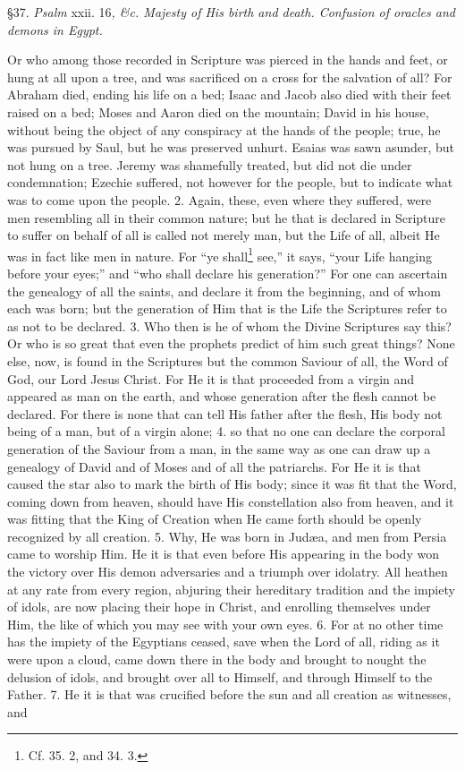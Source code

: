 
§37. \emph{Psalm} xxii. 16\emph{, \&c. Majesty of His birth and death. Confusion of oracles and demons in Egypt.}

Or who among those recorded in Scripture was pierced in the hands and feet, or hung at all upon a tree, and was sacrificed on a cross for the salvation of all? For Abraham died, ending his life on a bed; Isaac and Jacob also died with their feet raised on a bed; Moses and Aaron died on the mountain; David in his house, without being the object of any conspiracy at the hands of the people; true, he was pursued by Saul, but he was preserved unhurt. Esaias was sawn asunder, but not hung on a tree. Jeremy was shamefully treated, but did not die under condemnation; Ezechie suffered, not however for the people, but to indicate what was to come upon the people. 2. Again, these, even where they suffered, were men resembling all in their common nature; but he that is declared in Scripture to suffer on behalf of all is called not merely man, but the Life of all, albeit He was in fact like men in nature. For “ye shall\footnote{Cf. 35. 2, and 34. 3.} see,” it says, “your Life hanging before your eyes;” and “who shall declare his generation?” For one can ascertain the genealogy of all the saints, and declare it from the beginning, and of whom each was born; but the generation of Him that is the Life the Scriptures refer to as not to be declared. 3. Who then is he of whom the Divine Scriptures say this? Or who is so great that even the prophets predict of him such great things? None else, now, is found in the Scriptures but the common Saviour of all, the Word of God, our Lord Jesus Christ. For He it is that proceeded from a virgin and appeared as man on the earth, and whose generation after the flesh cannot be declared. For there is none that can tell His father after the flesh, His body not being of a man, but of a virgin alone; 4. so that no one can declare the corporal generation of the Saviour from a man, in the same way as one can draw up a genealogy of David and of Moses and of all the patriarchs. For He it is that caused the star also to mark the birth of His body; since it was fit that the Word, coming down from heaven, should have His constellation also from heaven, and it was fitting that the King of Creation when He came forth should be openly recognized by all creation. 5. Why, He was born in Judæa, and men from Persia came to worship Him. He it is that even before His appearing in the body won the victory over His demon adversaries and a triumph over idolatry. All heathen at any rate from every region, abjuring their hereditary tradition and the impiety of idols, are now placing their hope in Christ, and enrolling themselves under Him, the like of which you may see with your own eyes. 6. For at no other time has the impiety of the Egyptians ceased, save when the Lord of all, riding as it were upon a cloud, came down there in the body and brought to nought the delusion of idols, and brought over all to Himself, and through Himself to the Father. 7. He it is that was crucified before the sun and all creation as witnesses, and 